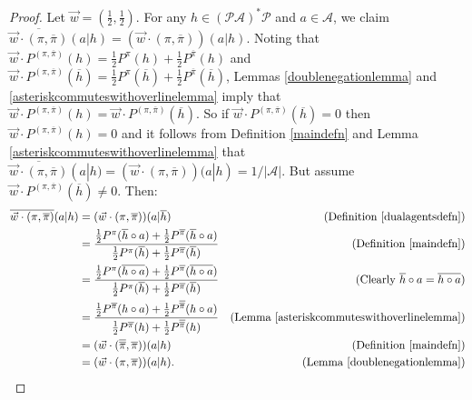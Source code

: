 \documentclass[twoside]{article}
\begin{document}
\begin{proof}
    Let $\vec w=(\frac12,\frac12)$.
    For any $h\in(\mathcal P\mathcal A)^*\mathcal P$ and $a\in\mathcal A$,
    we claim
    $\overline{\vec w\cdot(\pi,\overline{\pi})}(a|h)
    =(\vec w\cdot(\pi,\overline{\pi}))(a|h)$.
    Noting that
    $\vec w\cdot P^{(\pi,\overline{\pi})}(h)
    =\frac12P^\pi(h)+\frac12P^{\overline\pi}(h)$
    and
    $\vec w\cdot P^{(\pi,\overline{\pi})}(\overline h)
    =\frac12P^\pi(\overline h)+\frac12P^{\overline\pi}(\overline h)$,
    Lemmas \ref{doublenegationlemma} and \ref{asteriskcommuteswithoverlinelemma}
    imply that
    $\vec w\cdot P^{(\pi,\overline{\pi})}(h)
    =\vec w\cdot P^{(\pi,\overline{\pi})}(\overline h)$.
    So if
    $\vec w\cdot P^{(\pi,\overline{\pi})}(\overline h)=0$
    then $\vec w\cdot P^{(\pi,\overline{\pi})}(h)=0$
    and it follows from
    Definition \ref{maindefn}
    and Lemma \ref{asteriskcommuteswithoverlinelemma} that
    $\overline{\vec w\cdot(\pi,\overline{\pi})}(a|h)
    =(\vec w\cdot(\pi,\overline{\pi}))(a|h)=1/|\mathcal A|$.
    But assume $\vec w\cdot P^{(\pi,\overline{\pi})}(\overline h)\not=0$.
    Then:
    \begin{align*}
        \overline{\vec w\cdot(\pi,\overline{\pi})}(a|h)
        &= (\vec w\cdot(\pi,\overline{\pi}))(a|\overline h)
            &\mbox{(Definition \ref{dualagentsdefn})}\\
        &= \frac
            {\frac12P^\pi(\overline h\circ a)+\frac12P^{\overline\pi}(\overline h\circ a)}
            {\frac12P^\pi(\overline h)+\frac12P^{\overline\pi}(\overline h)}
            &\mbox{(Definition \ref{maindefn})}\\
        &= \frac
            {\frac12P^\pi(\overline{h\circ a})+\frac12P^{\overline\pi}(\overline{h\circ a})}
            {\frac12P^\pi(\overline h)+\frac12P^{\overline\pi}(\overline h)}
            &\mbox{(Clearly $\overline h\circ a=\overline{h\circ a}$)}\\
        &= \frac
            {\frac12P^{\overline\pi}(h\circ a)+\frac12P^{\overline{\overline\pi}}(h\circ a)}
            {\frac12P^{\overline\pi}(h)+\frac12P^{\overline{\overline\pi}}(h)}
            &\mbox{(Lemma \ref{asteriskcommuteswithoverlinelemma})}\\
        &= (\vec w\cdot(\overline{\overline\pi},\overline\pi))(a|h)
            &\mbox{(Definition \ref{maindefn})}\\
        &= (\vec w\cdot(\pi,\overline\pi))(a|h).
            &\mbox{(Lemma \ref{doublenegationlemma})}
    \end{align*}
\end{proof}
\end{document}
